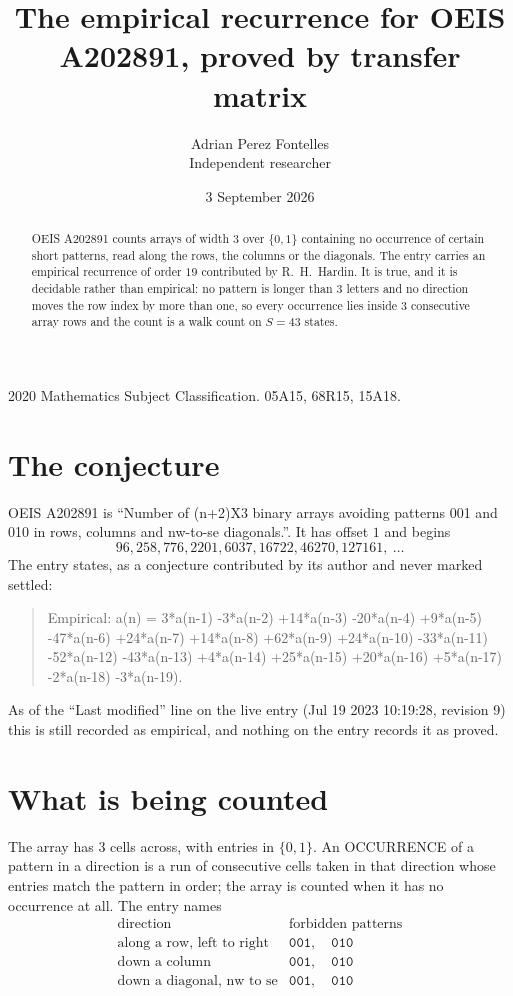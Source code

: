 \documentclass[11pt,a4paper]{article}
\title{The empirical recurrence for OEIS A202891, proved by transfer matrix}
\author{Adrian Perez Fontelles\\ \small Independent researcher}
\date{3 September 2026}
\theoremstyle{plain}
\theoremstyle{definition}
\begin{document}
\maketitle

\begin{abstract}
OEIS A202891 counts arrays of width $3$ over $\{0,1\}$ containing no occurrence of certain short
patterns, read along the rows, the columns or the diagonals. The entry carries an empirical
recurrence of order $19$ contributed by R.~H.~Hardin. It is true, and it is decidable
rather than empirical: no pattern is longer than $3$ letters and no direction moves the row
index by more than one, so every occurrence lies inside $3$ consecutive array rows and the
count is a walk count on $S=43$ states.
\end{abstract}

\noindent\small 2020 Mathematics Subject Classification. 05A15, 68R15, 15A18.\normalsize

\section{The conjecture}

OEIS A202891 is ``Number of (n+2)X3 binary arrays avoiding patterns 001 and 010 in rows, columns and nw-to-se diagonals.''. It has offset $1$ and begins
\[
96, 258, 776, 2201, 6037, 16722, 46270, 127161,\ \dots
\]
The entry states, as a conjecture contributed by its author and never marked settled:
\begin{quote}
Empirical: a(n) = 3*a(n-1) -3*a(n-2) +14*a(n-3) -20*a(n-4) +9*a(n-5) -47*a(n-6) +24*a(n-7) +14*a(n-8) +62*a(n-9) +24*a(n-10) -33*a(n-11) -52*a(n-12) -43*a(n-13) +4*a(n-14) +25*a(n-15) +20*a(n-16) +5*a(n-17) -2*a(n-18) -3*a(n-19).
\end{quote}
As of the ``Last modified'' line on the live entry (Jul 19 2023 10:19:28, revision 9) this is still
recorded as empirical, and nothing on the entry records it as proved.

\section{What is being counted}

The array has $3$ cells across, with entries in $\{0,1\}$. An OCCURRENCE of a pattern in a
direction is a run of consecutive cells taken in that direction whose entries match the pattern
in order; the array is counted when it has no occurrence at all. The entry names
\[
\begin{array}{ll}
\text{direction} & \text{forbidden patterns} \\[2pt]
\text{along a row, left to right} & \mathtt{001},\quad \mathtt{010} \\
\text{down a column} & \mathtt{001},\quad \mathtt{010} \\
\text{down a diagonal, nw to se} & \mathtt{001},\quad \mathtt{010} \\
\end{array}
\]
\end{document}
